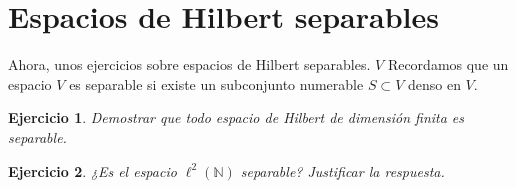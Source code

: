 \documentclass[11pt]{report}
\newtheorem{ex}{Ejercicio}
\newenvironment{solution}{\begin{proof}[Solución]}{\end{proof}}
\begin{document}
\section{Espacios de Hilbert separables}

\noindent
Ahora, unos ejercicios sobre espacios de Hilbert separables.
 $V$
Recordamos que un espacio $V$
 es separable si existe un subconjunto numerable $S \subset V$ denso en $V$. 


\begin{ex}
Demostrar que todo espacio de Hilbert de dimensión finita es separable.
\end{ex}



\begin{ex}
¿Es el espacio $\ell^2(\mathbb{N})$ separable? Justificar la respuesta.
\end{ex}

%

\end{document}
